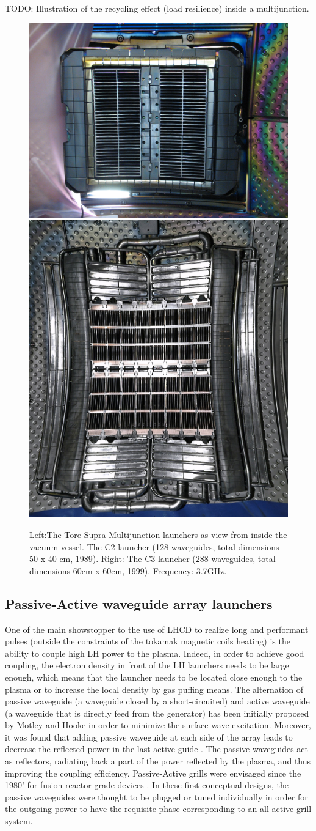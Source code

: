 TODO: Illustration of the recycling effect (load resilience) inside a multijunction.


\begin{figure}
\centering
\includegraphics[width=0.3\linewidth]{Figures/LHCD/ToreSupra_C2}
\includegraphics[width=0.4\linewidth]{Figures/LHCD/ToreSupra_C3}
\caption{Left:The Tore Supra Multijunction launchers as view from inside the vacuum vessel. The C2 launcher (128 waveguides, total dimensions 50 x 40 cm, 1989). Right: The C3 launcher (288 waveguides, total dimensions 60cm x 60cm, 1999). Frequency: 3.7GHz.}
\label{fig:toresupraC2C3}
\end{figure}


\subsection{Passive-Active waveguide array launchers}
One of the main showstopper to the use of LHCD to realize long and performant pulses (outside the constraints of the tokamak magnetic coils heating) is the ability to couple high LH power to the plasma. Indeed, in order to achieve good coupling, the electron density in front of the LH launchers needs to be large enough, which means that the launcher needs to be located close enough to the plasma or to increase the local density by gas puffing means. 
The alternation of passive waveguide (a waveguide closed by a short-circuited) and active waveguide (a waveguide that is directly feed from the generator) has been initially proposed by Motley and Hooke \parencite{Motley1980} in order to minimize the surface wave excitation. Moreover, it was found that adding passive waveguide at each side of the array leads to decrease the reflected power in the last active guide \parencite{Krapchev1978, Motley1980B}. The passive waveguides act as reflectors, radiating back a part of the power reflected by the plasma, and thus improving the coupling efficiency. Passive-Active grills were envisaged since the 1980' for fusion-reactor grade devices \parencite{Ehst1982}. In these first conceptual designs, the passive waveguides were thought to be plugged or tuned individually in order for the outgoing power to have the requisite phase corresponding to an all-active grill system. 

